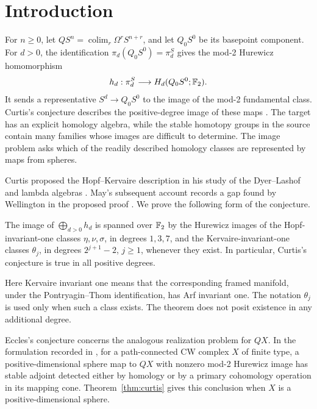 \section{Introduction}

For \(n\ge0\), let
\(QS^n=\operatorname*{colim}_r\Omega^rS^{n+r}\), and let \(Q_0S^0\)
be its basepoint component. For \(d>0\), the identification
\(\pi_d(Q_0S^0)=\pi_d^S\) gives the mod-2 Hurewicz homomorphism
\[
h_d:\pi_d^S\longrightarrow H_d(Q_0S^0;\mathbb F_2).
\]
It sends a representative \(S^d\to Q_0S^0\) to the image of the
mod-2 fundamental class. Curtis's conjecture describes the positive-degree
image of these maps \cite{Curtis1975}.
The target has an explicit homology algebra, while the stable homotopy
groups in the source contain many families whose images are difficult
to determine. The image problem asks which of the readily described
homology classes are represented by maps from spheres.

Curtis proposed the Hopf--Kervaire description in his study of the
Dyer--Lashof and lambda algebras \cite{Curtis1975}. May's subsequent
account records a gap found by Wellington in the proposed proof
\cite[p.~484, footnote~3]{May1977}. We prove the following form of
the conjecture.

\begin{theorem}\label{thm:curtis}
The image of \(\bigoplus_{d>0}h_d\) is spanned over \(\mathbb F_2\) by
the Hurewicz images of the Hopf-invariant-one classes
\(\eta,\nu,\sigma\), in degrees \(1,3,7\), and the
Kervaire-invariant-one classes \(\theta_j\), in degrees
\(2^{j+1}-2\), \(j\ge1\), whenever they exist.
In particular, Curtis's conjecture is true in all positive degrees.
\end{theorem}

Here Kervaire invariant one means that the corresponding framed manifold,
under the Pontryagin--Thom identification, has Arf invariant one. The
notation \(\theta_j\) is used only when such a class exists. The theorem
does not posit existence in any additional degree.

Eccles's conjecture concerns the analogous realization problem for
\(QX\). In the formulation recorded in
\cite[pp.~14--15]{Zare2009Thesis}, for a path-connected CW complex
\(X\) of finite type, a positive-dimensional sphere
map to \(QX\) with nonzero mod-2 Hurewicz image has stable adjoint
detected either by homology or by a primary cohomology operation in
its mapping cone. Theorem~\ref{thm:curtis} gives this conclusion
when \(X\) is a positive-dimensional sphere.

